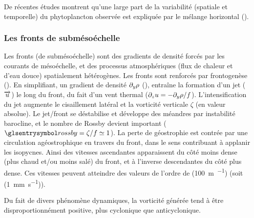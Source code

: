 De récentes études montrent qu'une large part de la variabilité (spatiale et temporelle) du phytoplancton observée est expliquée par le mélange horizontal (\cite{glover_2018,keerthi_2022,jonsson_2023}).



\subsubsection{Les fronts de submésoéchelle}

Les fronts (de submésoéchelle) sont des gradients de densité forcés par les courants de mésoéchelle, et des processus atmosphériques (flux de chaleur et d'eau douce) spatialement hétérogènes.
Les fronts sont renforcés par frontogenèse (\cite{thomas_2008,mcwilliams_2016}).
En simplifiant, un gradient de densité \(\textder{\rho}{y}\) (), entraîne la formation d'un jet (\(\vect{u}\)) le long du front, du fait d'un vent thermal (\(\textder{u}{z} = -\textder{\rho}{y} / f\)).
L'intensification du jet augmente le cisaillement latéral et la vorticité verticale \(\zeta\) (en valeur absolue).
Le jet/front se déstabilise et développe des méandres par instabilité barocline, et le nombre de Rossby devient important (\(\am{rossby} = \zeta / f \simeq 1\)).
La perte de géostrophie est contrée par une circulation agéostrophique en travers du front, dans le sens contribuant à applanir les isopycnes.
Ainsi des vitesses ascendantes apparaissent du côté moins dense (plus chaud et/ou moins salé) du front, et à l'inverse descendantes du côté plus dense.
Ces vitesses peuvent atteindre des valeurs de l'ordre de \OM(\qty{100}{\meter\per\jr}) (soit \OM(\qty{1}{\mm\per\s})).

\begin{note}
  Du fait de divers phénomène dynamiques, la vorticité générée tend à être disproportionnément positive,  plus cyclonique que anticyclonique.
\end{note}

\begin{figure}
  \centering
  \label{fig:frontogenesis}
\end{figure}

